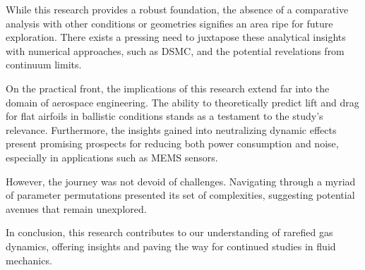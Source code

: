 While this research provides a robust foundation, the absence of a comparative analysis with other conditions or geometries signifies an area ripe for future exploration. There exists a pressing need to juxtapose these analytical insights with numerical approaches, such as DSMC, and the potential revelations from continuum limits.

On the practical front, the implications of this research extend far into the domain of aerospace engineering. The ability to theoretically predict lift and drag for flat airfoils in ballistic conditions stands as a testament to the study's relevance. Furthermore, the insights gained into neutralizing dynamic effects present promising prospects for reducing both power consumption and noise, especially in applications such as MEMS sensors.

However, the journey was not devoid of challenges. Navigating through a myriad of parameter permutations presented its set of complexities, suggesting potential avenues that remain unexplored.

In conclusion, this research contributes to our understanding of rarefied gas dynamics, offering insights and paving the way for continued studies in fluid mechanics.